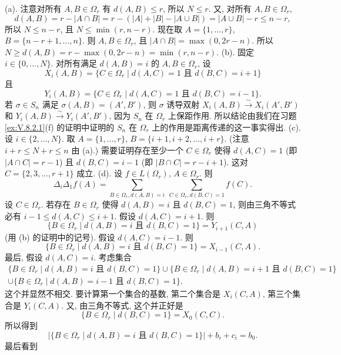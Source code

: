 \begin{solution}
(a). 注意对所有 $A, B \in \Omega_r$ 有 $d(A, B) \leq r$, 所以 $N \leq r$. 又, 对所有 $A, B \in \Omega_r$,
\[
d(A, B) = r - |A \cap B| = r - (|A| + |B| - |A \cup B|) = |A \cup B| - r \leq n - r,
\]
所以 $N \leq n - r$, 且 $N \leq \min(r, n - r)$.
现在取 $A = \{1, \ldots, r\}$, $B = \{n - r + 1, \ldots, n\}$. 则 $A, B \in \Omega_r$, 且 $|A \cap B| = \max(0, 2r - n)$. 所以 $N \geq d(A, B) = r - \max(0, 2r - n) = \min(r, n - r)$.
(b). 固定 $i \in \{0, \ldots, N\}$. 对所有满足 $d(A, B) = i$ 的 $A, B \in \Omega_r$, 设
\[
X_i(A, B) = \{C \in \Omega_r \mid d(A, C) = 1 \text{ 且 } d(B, C) = i + 1\}
\]
且
\[
Y_i(A, B) = \{C \in \Omega_r \mid d(A, C) = 1 \text{ 且 } d(B, C) = i - 1\}.
\]
若 $\sigma \in S_n$ 满足 $\sigma(A, B) = (A', B')$, 则 $\sigma$ 诱导双射 $X_i(A, B) \xrightarrow{\sim} X_i(A', B')$ 和 $Y_i(A, B) \xrightarrow{\sim} Y_i(A', B')$, 因为 $S_n$ 在 $\Omega_r$ 上保距作用. 所以结论由我们在习题 \ref{ex:V.8.2.1}(f) 的证明中证明的 $S_n$ 在 $\Omega_r$ 上的作用是距离传递的这一事实得出.
(c). 设 $i \in \{2, \ldots, N\}$. 取 $A = \{1, \ldots, r\}$, $B = \{i + 1, i + 2, \ldots, i + r\}$. (注意 $i + r \leq N + r \leq n$ 由 (a).) 需要证明存在至少一个 $C \in \Omega_r$ 使得 $d(A, C) = 1$ (即 $|A \cap C| = r - 1$) 且 $d(B, C) = i - 1$ (即 $|B \cap C| = r - i + 1$). 这对 $C = \{2, 3, \ldots, r + 1\}$ 成立.
(d). 设 $f \in L(\Omega_r)$, $A \in \Omega_r$. 则
\[
\Delta_i\Delta_1f(A) = \sum_{B \in \Omega_r, d(A,B)=i}\ \sum_{C \in \Omega_r, d(B,C)=1}f(C).
\]
设 $C \in \Omega_r$. 若存在 $B \in \Omega_r$ 使得 $d(A, B) = i$ 且 $d(B, C) = 1$, 则由三角不等式必有 $i - 1 \leq d(A, C) \leq i + 1$.
假设 $d(A, C) = i + 1$. 则
\[
\{B \in \Omega_r \mid d(A, B) = i \text{ 且 } d(B, C) = 1\} = Y_{i+1}(C, A)
\]
(用 (b) 的证明中的记号). 假设 $d(A, C) = i - 1$. 则
\[
\{B \in \Omega_r \mid d(A, B) = i \text{ 且 } d(B, C) = 1\} = X_{i-1}(C, A).
\]
最后, 假设 $d(A, C) = i$. 考虑集合
\begin{multline*}
\{B \in \Omega_r \mid d(A, B) = i \text{ 且 } d(B, C) = 1\} \cup \{B \in \Omega_r \mid d(A, B) = i + 1 \text{ 且 } d(B, C) = 1\} \\
\cup \{B \in \Omega_r \mid d(A, B) = i - 1 \text{ 且 } d(B, C) = 1\}.
\end{multline*}
这个并显然不相交. 要计算第一个集合的基数, 第二个集合是 $X_i(C, A)$, 第三个集合是 $Y_i(C, A)$. 又, 由三角不等式, 这个并正好是
\[
\{B \in \Omega_r \mid d(B, C) = 1\} = X_0(C, C).
\]
所以得到
\[
|\{B \in \Omega_r \mid d(A, B) = i \text{ 且 } d(B, C) = 1\}| + b_i + c_i = b_0.
\]
最后看到
\begin{align*}

\end{align*}
\end{solution}
